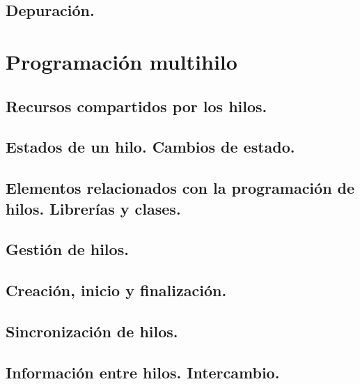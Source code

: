 \documentclass[a4paper,12pt,spanish]{sphinxmanual}
\begin{document}
\section{Depuración.}
\label{textos/tema1:depuracion}

\chapter{Programación multihilo}
\label{textos/tema2::doc}\label{textos/tema2:programacion-multihilo}

\section{Recursos compartidos por los hilos.}
\label{textos/tema2:recursos-compartidos-por-los-hilos}

\section{Estados de un hilo. Cambios de estado.}
\label{textos/tema2:estados-de-un-hilo-cambios-de-estado}

\section{Elementos relacionados con la programación de hilos. Librerías y clases.}
\label{textos/tema2:elementos-relacionados-con-la-programacion-de-hilos-librerias-y-clases}

\section{Gestión de hilos.}
\label{textos/tema2:gestion-de-hilos}

\section{Creación, inicio y finalización.}
\label{textos/tema2:creacion-inicio-y-finalizacion}

\section{Sincronización de hilos.}
\label{textos/tema2:sincronizacion-de-hilos}

\section{Información entre hilos. Intercambio.}
\label{textos/tema2:informacion-entre-hilos-intercambio}
\end{document}
